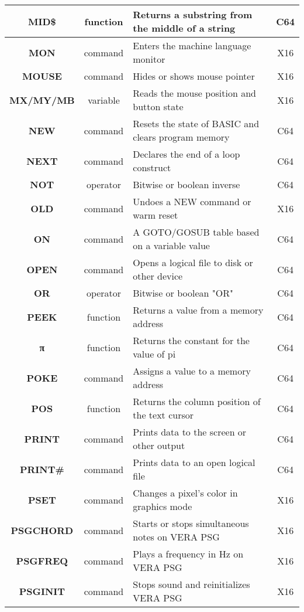 \begin{longtable}{|c|c|m{4cm}|c|}
	{\bfseries MID\$} & function & Returns a substring from the middle of a string & C64 \\ \hline
	{\bfseries MON} & command & Enters the machine language monitor & X16 \\ \hline
	{\bfseries MOUSE} & command & Hides or shows mouse pointer & X16 \\ \hline
	{\bfseries MX/MY/MB} & variable & Reads the mouse position and button state & X16 \\ \hline
	{\bfseries NEW} & command & Resets the state of BASIC and clears program memory & C64 \\ \hline
	{\bfseries NEXT} & command & Declares the end of a loop construct & C64 \\ \hline
	{\bfseries NOT} & operator & Bitwise or boolean inverse & C64 \\ \hline
	{\bfseries OLD} & command & Undoes a NEW command or warm reset & X16 \\ \hline
	{\bfseries ON} & command & A GOTO/GOSUB table based on a variable value & C64 \\ \hline
	{\bfseries OPEN} & command & Opens a logical file to disk or other device & C64 \\ \hline
	{\bfseries OR} & operator & Bitwise or boolean "OR" & C64 \\ \hline
	{\bfseries PEEK} & function & Returns a value from a memory address & C64 \\ \hline
	{\ttfamily\bfseries π} & function & Returns the constant for the value of pi & C64 \\ \hline
	{\bfseries POKE} & command & Assigns a value to a memory address & C64 \\ \hline
	{\bfseries POS} & function & Returns the column position of the text cursor & C64 \\ \hline
	{\bfseries PRINT} & command & Prints data to the screen or other output & C64 \\ \hline
	{\bfseries PRINT\#} & command & Prints data to an open logical file & C64 \\ \hline
	{\bfseries PSET} & command & Changes a pixel's color in graphics mode & X16 \\ \hline
	{\bfseries PSGCHORD} & command & Starts or stops simultaneous notes on VERA PSG & X16 \\ \hline
	{\bfseries PSGFREQ} & command & Plays a frequency in Hz on VERA PSG & X16 \\ \hline
	{\bfseries PSGINIT} & command & Stops sound and reinitializes VERA PSG & X16 \\ \hline

\end{longtable}
